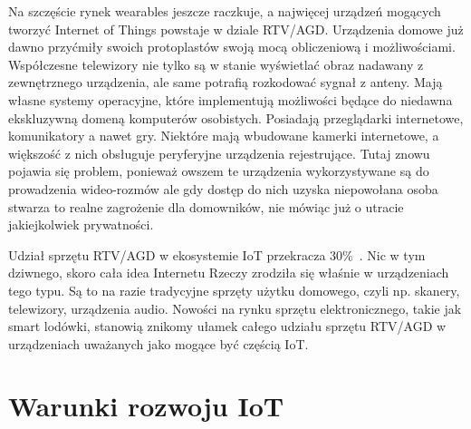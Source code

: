 \documentclass[brudnopis]{xmgr}
\begin{document}
Na szczęście rynek wearables jeszcze raczkuje, a najwięcej urządzeń mogących tworzyć Internet of Things powstaje w dziale RTV/AGD. Urządzenia domowe już dawno przyćmiły swoich protoplastów swoją mocą obliczeniową i możliwościami. Współczesne telewizory nie tylko są w stanie wyświetlać obraz nadawany z zewnętrznego urządzenia, ale same potrafią rozkodować sygnał z anteny. Mają własne systemy operacyjne, które implementują możliwości będące do niedawna ekskluzywną domeną komputerów osobistych. Posiadają przeglądarki internetowe, komunikatory a nawet gry. Niektóre mają wbudowane kamerki internetowe, a większość z nich obsługuje peryferyjne urządzenia rejestrujące. Tutaj znowu pojawia się problem, ponieważ owszem te urządzenia wykorzystywane są do prowadzenia wideo-rozmów ale gdy dostęp do nich uzyska niepowołana osoba stwarza to realne zagrożenie dla domowników, nie mówiąc już o utracie jakiejkolwiek prywatności.

Udział sprzętu RTV/AGD w ekosystemie IoT przekracza 30\%~\cite{IotWPolsce:2015:CMC}. Nic w tym dziwnego, skoro cała idea Internetu Rzeczy zrodziła się właśnie w urządzeniach tego typu. Są to na razie tradycyjne sprzęty użytku domowego, czyli np. skanery, telewizory, urządzenia audio. Nowości na rynku sprzętu elektronicznego, takie jak smart lodówki, stanowią znikomy ułamek całego udziału sprzętu RTV/AGD w urządzeniach uważanych jako mogące być częścią IoT.

\section{Warunki rozwoju IoT}
\end{document}
